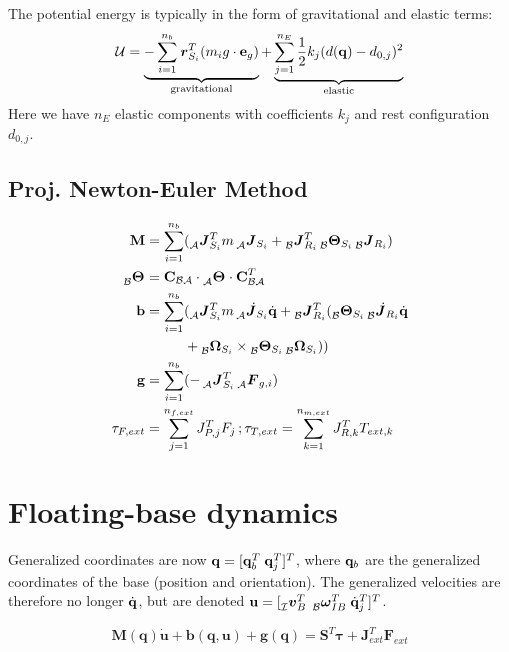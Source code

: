 \documentclass[a4paper, 8pt]{extarticle}
\newcommand{\mvec}[3]{  \prescript{}{\mathcal{#1}}{\bm{#2}}  _{#3} }
\newcommand{\mdvec}[3]{ \prescript{}{\mathcal{#1}}{\dot{\bm #2}} _{#3} }
\newcommand{\mrot}[2]{ \textbf{#1}_{ \mathcal{#2} } }
\begin{document}
\begin{multicols*}{3}
The potential energy is typically in the form of gravitational and elastic terms:
$$\mathcal U = \underbrace{ -\sum_{i=1}^{n_b} \mvec{}{r}{S_i}^T (m_i g \cdot {\bf e}_{g}) }_{\text{gravitational}} + \underbrace{ \sum_{j = 1}^{n_E} \frac 12 k_j(d({\bf q}) - d_{0,j})^2}_{\text{elastic}}$$
Here we have $n_E$ elastic components with coefficients $k_j$ and rest configuration $d_{0,j}$.



\subsection{Proj. Newton-Euler Method}
\begin{align*}
\mathbf M &= \sum_{i = 1}^{n_b} (\mvec{A}{J}{S_i}^T m \mvec{A}{J}{S_i} + \mvec{B}{J}{R_i}^T \mvec{B}{\Theta}{S_i} \mvec{B}{J}{R_i}) \\
\mvec{B}{\Theta}{} &= \mrot{C}{BA} \cdot \mvec{A}{\Theta}{} \cdot \mrot{C}{BA}^T\\
\mathbf b &= \sum_{i = 1}^{n_b} (\mvec{A}{J}{S_i}^T m \mdvec{A}{J}{S_i}\dot{\bf q} + \mvec{B}{J}{R_i}^T ( \mvec{B}{\Theta}{S_i} \mdvec{B}{J}{R_i}\dot{\bf q}\\
& \mkern50mu+ \mvec{B}{\Omega}{S_i} \times \mvec{B}{\Theta}{S_i} \mvec{B}{\Omega}{S_i})) \\
\mathbf g &= \sum_{i=1}^{n_b}(-\mvec{A}{J}{S_i}^T \mvec{A}{F}{g,i})\\
\tau _{F,ext} &= \sum_{j=1}^{n_{f,ext}} J_{P,j}^T F_{j} \, \textrm{;} \, \tau _{T,ext} = \sum_{k=1}^{n_{m,ext}} J_{R,k}^T T_{ext,k}
\end{align*}


\section{Floating-base dynamics}

Generalized coordinates are now $\mathbf q = [ {\bf q} _b^T \;  {\bf q}_j^T ]^T$, where ${\bf q}_b$ are the generalized coordinates of the base (position and orientation). The generalized velocities are therefore no longer $\dot{\bf q}$, but are denoted ${\bf u} = [\mvec{I}{v}{B}^T \; \mvec{B}{\omega}{IB}^T \; \dot{\bf q}_j^T ]^T$.

$$\boxed{\mathbf{ M(q)\dot{u} + b(q, u) + g(q)} = \mathbf{S}^T\bm\tau + \mathbf{J}_{ext}^T \mathbf F_{ext}}$$


\end{multicols*}
\end{document}
